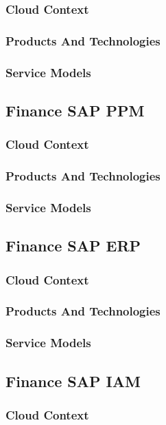 \documentclass{llncs}
\begin{document}
\subsubsection{Cloud Context}
\subsubsection{Products And Technologies}
\subsubsection{Service Models}

\subsection{Finance	SAP PPM}
\subsubsection{Cloud Context}
\subsubsection{Products And Technologies}
\subsubsection{Service Models}

\subsection{Finance	SAP ERP}
\subsubsection{Cloud Context}
\subsubsection{Products And Technologies}
\subsubsection{Service Models}

\subsection{Finance	SAP IAM}
\subsubsection{Cloud Context}
\end{document}
